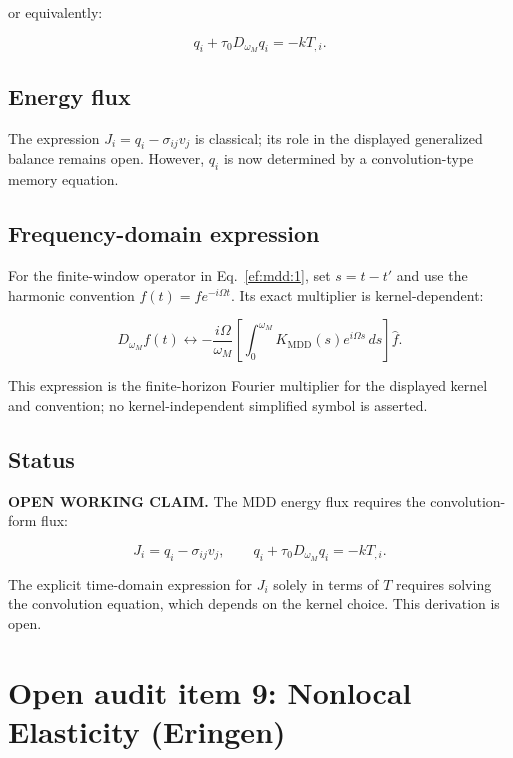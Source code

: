 or equivalently:

\begin{equation}
q_i + \tau_0 D_{\omega_M} q_i = -k T_{,i}.
\label{ef:mdd:3}
\end{equation}

\subsection{Energy flux}

The expression $J_i=q_i-\sigma_{ij}v_j$ is classical; its role in the displayed generalized balance remains open. However, $q_i$ is now determined by a convolution-type memory equation.

\subsection{Frequency-domain expression}

For the finite-window operator in Eq.~\eqref{ef:mdd:1}, set $s=t-t'$ and use the harmonic convention $f(t)=\hat f e^{-i\Omega t}$. Its exact multiplier is kernel-dependent:

\begin{equation}
D_{\omega_M} f(t) \longleftrightarrow -\frac{i\Omega}{\omega_M}\left[\int_0^{\omega_M}K_{\mathrm{MDD}}(s)e^{i\Omega s}\,ds\right]\hat f.
\label{ef:mdd:4}
\end{equation}

This expression is the finite-horizon Fourier multiplier for the displayed kernel and convention; no kernel-independent simplified symbol is asserted.

\subsection{Status}

\textbf{OPEN WORKING CLAIM.} The MDD energy flux requires the convolution-form flux:

\begin{equation}
J_i = q_i - \sigma_{ij}v_j,
\qquad q_i + \tau_0 D_{\omega_M} q_i = -k T_{,i}.
\label{ef:mdd:5}
\end{equation}

The explicit time-domain expression for $J_i$ solely in terms of $T$ requires solving the convolution equation, which depends on the kernel choice. This derivation is open.

\section{Open audit item 9: Nonlocal Elasticity (Eringen)}

